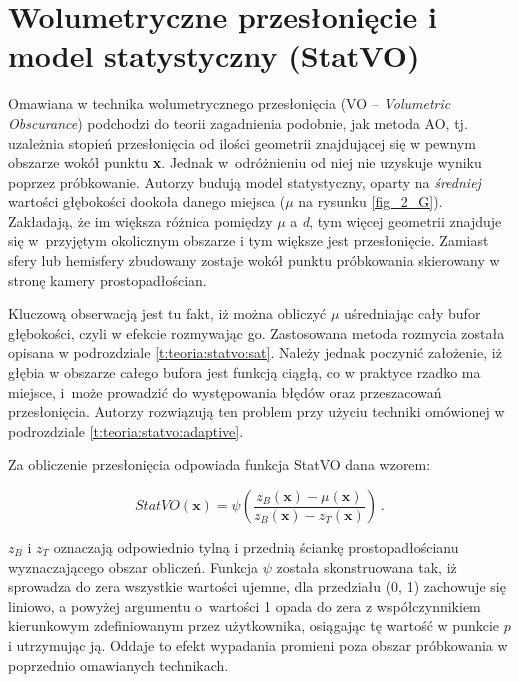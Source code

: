 	\section{Wolumetryczne przesłonięcie i model statystyczny (StatVO)}
	\label{t:teoria:statvo}
	
	Omawiana w \cite{statvo} technika wolumetrycznego przesłonięcia (VO -- \textit{Volumetric Obscurance}) podchodzi do teorii zagadnienia podobnie, jak metoda AO, tj. uzależnia stopień przesłonięcia od ilości geometrii znajdującej się w pewnym obszarze wokół punktu \textbf{x}. Jednak w~odróżnieniu od niej nie uzyskuje wyniku poprzez próbkowanie. Autorzy \cite{statvo} budują model statystyczny, oparty na \textit{średniej} wartości głębokości dookoła danego miejsca (\(\mu\) na rysunku \ref{fig_2_G}). Zakładają, że im większa różnica pomiędzy \(\mu\) a \textit{d}, tym więcej geometrii znajduje się w~przyjętym okolicznym obszarze i tym większe jest przesłonięcie. Zamiast sfery lub hemisfery zbudowany zostaje wokół punktu próbkowania skierowany w stronę kamery prostopadłościan.
	
	
	Kluczową obserwacją jest tu fakt, iż można obliczyć \(\mu\) uśredniając cały bufor głębokości, czyli w efekcie rozmywając go. Zastosowana metoda rozmycia została opisana w podrozdziale \ref{t:teoria:statvo:sat}. Należy jednak poczynić założenie, iż głębia w obszarze całego bufora jest funkcją ciągłą, co w praktyce rzadko ma miejsce, i~może prowadzić do występowania błędów oraz przeszacowań przesłonięcia. Autorzy rozwiązują ten problem przy użyciu techniki omówionej w podrozdziale \ref{t:teoria:statvo:adaptive}.
	
	
	Za obliczenie przesłonięcia odpowiada funkcja StatVO dana wzorem:
	
	\begin{equation}
	\mathit{StatVO}(\mathbf{x}) = \psi(\frac{z_{B}(\mathbf{x}) - \mu(\mathbf{x})}{z_{B}(\mathbf{x}) - z_{T}(\mathbf{x})})\ .
	\end{equation}
	
	\(z_{B}\) i \(z_{T}\) oznaczają odpowiednio tylną i przednią ściankę prostopadłościanu wyznaczającego obszar obliczeń. Funkcja \(\psi\) została skonstruowana tak, iż sprowadza do zera wszystkie wartości ujemne, dla przedziału (0, 1) zachowuje się liniowo, a powyżej argumentu o~wartości 1 opada do zera z współczynnikiem kierunkowym zdefiniowanym przez użytkownika, osiągając tę wartość w punkcie \(p\) i utrzymując ją. Oddaje to efekt wypadania promieni poza obszar próbkowania w poprzednio omawianych technikach.
	
